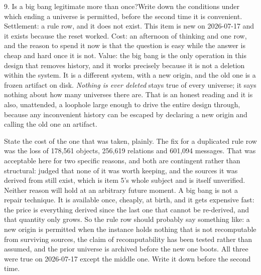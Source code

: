 \begin{Open}{9. Is a big bang legitimate more than once?}{Write down the conditions under which ending a universe is permitted, before the second time it is convenient.}
Settlement: a rule row, and it does not exist. This item is new on 2026-07-17 and it exists because the reset worked. Cost: an afternoon of thinking and one row, and the reason to spend it now is that the question is easy while the answer is cheap and hard once it is not. Value: the big bang is the only operation in this design that removes history, and it works precisely because it is not a deletion within the system. It is a different system, with a new origin, and the old one is a frozen artifact on disk. \textit{Nothing is ever deleted} stays true of every universe; it says nothing about how many universes there are. That is an honest reading and it is also, unattended, a loophole large enough to drive the entire design through, because any inconvenient history can be escaped by declaring a new origin and calling the old one an artifact.

State the cost of the one that was taken, plainly. The fix for a duplicated rule row was the loss of 178,561 objects, 256,619 relations and 601,094 messages. That was acceptable here for two specific reasons, and both are contingent rather than structural: \labPI{} judged that none of it was worth keeping, and the sources it was derived from still exist, which is item 5's whole subject and is itself unverified. Neither reason will hold at an arbitrary future moment. A big bang is not a repair technique. It is available once, cheaply, at birth, and it gets expensive fast: the price is everything derived since the last one that cannot be re-derived, and that quantity only grows. So the rule row should probably say something like: a new origin is permitted when the instance holds nothing that is not recomputable from surviving sources, the claim of recomputability has been tested rather than assumed, and the prior universe is archived before the new one boots. All three were true on 2026-07-17 except the middle one. Write it down before the second time.
\end{Open}


